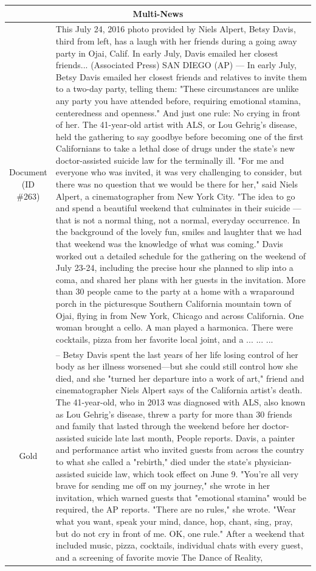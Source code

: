 \begin{table}[bth!]
\scriptsize
\centering
\renewcommand{\arraystretch}{1.3}
\begin{tabular}{c|p{}}
\hline
\multicolumn{2}{c}{Multi-News} \\ \hline
\makecell{Document\\(ID \#263)} & 
This July 24, 2016 photo provided by Niels Alpert, Betsy Davis, third from left, has a laugh with her friends during a going away party in Ojai, Calif. In early July, Davis emailed her closest friends... (Associated Press) SAN DIEGO (AP) — In early July, Betsy Davis emailed her closest friends and relatives to invite them to a two-day party, telling them: "These circumstances are unlike any party you have attended before, requiring emotional stamina, centeredness and openness." And just one rule: No crying in front of her. The 41-year-old artist with ALS, or Lou Gehrig's disease, held the gathering to say goodbye before becoming one of the first Californians to take a lethal dose of drugs under the state's new doctor-assisted suicide law for the terminally ill. "For me and everyone who was invited, it was very challenging to consider, but there was no question that we would be there for her," said Niels Alpert, a cinematographer from New York City. "The idea to go and spend a beautiful weekend that culminates in their suicide — that is not a normal thing, not a normal, everyday occurrence. In the background of the lovely fun, smiles and laughter that we had that weekend was the knowledge of what was coming." Davis worked out a detailed schedule for the gathering on the weekend of July 23-24, including the precise hour she planned to slip into a coma, and shared her plans with her guests in the invitation. More than 30 people came to the party at a home with a wraparound porch in the picturesque Southern California mountain town of Ojai, flying in from New York, Chicago and across California. One woman brought a cello. A man played a harmonica. There were cocktails, pizza from her favorite local joint, and a ... ... ... 
\\ \hline
Gold & 
– Betsy Davis spent the last years of her life losing control of her body as her illness worsened—but she could still control how she died, and she "turned her departure into a work of art," friend and cinematographer Niels Alpert says of the California artist's death. The 41-year-old, who in 2013 was diagnosed with ALS, also known as Lou Gehrig's disease, threw a party for more than 30 friends and family that lasted through the weekend before her doctor-assisted suicide late last month, People reports. Davis, a painter and performance artist who invited guests from across the country to what she called a "rebirth," died under the state's physician-assisted suicide law, which took effect on June 9. "You're all very brave for sending me off on my journey," she wrote in her invitation, which warned guests that "emotional stamina" would be required, the AP reports. "There are no rules," she wrote. "Wear what you want, speak your mind, dance, hop, chant, sing, pray, but do not cry in front of me. OK, one rule." After a weekend that included music, pizza, cocktails, individual chats with every guest, and a screening of favorite movie The Dance of Reality,

\end{tabular}
\end{table}
